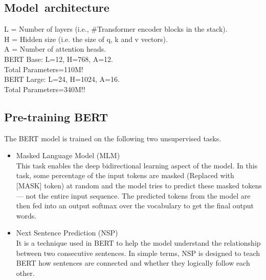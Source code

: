\subsection{Model architecture}
L = Number of layers (i.e., \#Transformer encoder blocks in the stack).\\
H = Hidden size (i.e. the size of q, k and v vectors).\\
A = Number of attention heads.\\
BERT Base: L=12, H=768, A=12.\\
Total Parameters=110M!\\
BERT Large: L=24, H=1024, A=16.\\
Total Parameters=340M!!


\subsection{Pre-training BERT}
The BERT model is trained on the following two unsupervised tasks.
\begin{itemize}
    \item Masked Language Model (MLM)\\
        This task enables the deep bidirectional learning aspect of the model. In this task, some percentage of the input tokens are masked (Replaced with [MASK] token) at random and the model tries to predict these masked tokens — not the entire input sequence. The predicted tokens from the model are then fed into an output softmax over the vocabulary to get the final output words.
    \item  Next Sentence Prediction (NSP)\\
        It is a technique used in BERT to help the model understand the relationship between two consecutive sentences. In simple terms, NSP is designed to teach BERT how sentences are connected and whether they logically follow each other.
\end{itemize}






